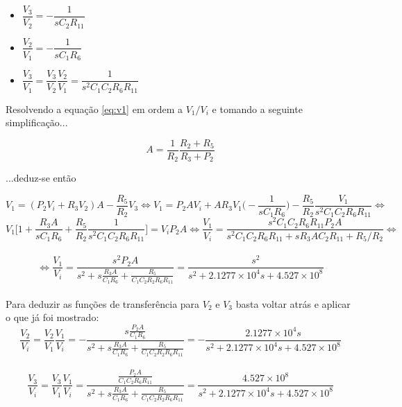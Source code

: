 \documentclass[a4paper,11pt]{report}
\begin{document}
\begin{itemize}
\item $\dfrac{V_3}{V_2}=-\dfrac{1}{sC_2R_{11}}$
\item $\dfrac{V_2}{V_1}=-\dfrac{1}{sC_1R_6}$
\item $\dfrac{V_3}{V_1}=\dfrac{V_3}{V_2}\dfrac{V_2}{V_1}=\dfrac{1}{s^2C_1C_2R_6R_{11}}$
\end{itemize}

Resolvendo a equação \ref{eq:v1} em ordem a $V_1/V_i$ e tomando a seguinte simplificação...

\begin{equation*}
A=\dfrac{1}{R_2}\dfrac{R_2+R_5}{R_3+P_2}
\end{equation*}

...deduz-se então

\begin{equation*}
V_1=(P_2V_i+R_3V_2)A-\frac{R_5}{R_2}V_3\Leftrightarrow V_1=P_2AV_i+AR_3V_1\Bigg(-\frac{1}{sC_1R_6}\Bigg)-\frac{R_5}{R_2}\frac{V_1}{s^2C_1C_2R_6R_{11}}\Leftrightarrow
\end{equation*}
\begin{equation*}
V_1\Bigg[1+\frac{R_3A}{sC_1R_6}+\frac{R_5}{R_2}\frac{1}{s^2C_1C_2R_6R_{11}}\Bigg]=V_iP_2A\Leftrightarrow \frac{V_1}{V_i}=\frac{s^2C_1C_2R_6R_{11}P_2A}{s^2C_1C_2R_6R_{11}+sR_3AC_2R_{11}+R_5/R_2}\Leftrightarrow
\end{equation*}
\\
\begin{equation}\label{eq:T1}
\Leftrightarrow\boxed{\dfrac{V_1}{V_i}=\dfrac{s^2P_2A}{s^2+s\frac{R_3A}{C_1R_6}+\frac{R_5}{C_1C_2R_2R_6R_{11}}}=\dfrac{s^2}{s^2+2.1277\times 10^4s+4.527\times 10^8}}
\end{equation}\\

Para deduzir as funções de transferência para $V_2$ e $V_3$ basta voltar atrás e aplicar o que já foi mostrado:
\begin{equation}\label{eq:T2}
\boxed{\dfrac{V_2}{V_i}=\dfrac{V_2}{V_1}\dfrac{V_1}{V_i}=-\dfrac{s\frac{P_2A}{C_1R_6}}{s^2+s\frac{R_3A}{C_1R_6}+\frac{R_5}{C_1C_2R_2R_6R_{11}}}=-\dfrac{2.1277\times 10^4s}{s^2+2.1277\times 10^4s+4.527\times 10^8}}
\end{equation}\\
\begin{equation}\label{eq:T3}
\boxed{\dfrac{V_3}{V_i}=\dfrac{V_3}{V_1}\dfrac{V_1}{V_i}=\dfrac{\frac{P_2A}{C_1C_2R_6R_{11}}}{s^2+s\frac{R_3A}{C_1R_6}+\frac{R_5}{C_1C_2R_2R_6R_{11}}}=\dfrac{4.527\times 10^8}{s^2+2.1277\times 10^4s+4.527\times 10^8}}
\end{equation}
\end{document}
